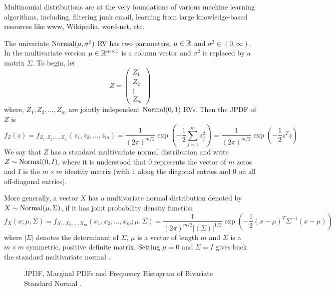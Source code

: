 Multinomial distributions are at the very foundations of various machine learning algorithms, including, filtering junk email, learning from large knowledge-based resources like www, Wikipedia, word-net, etc.


\begin{model}[$\normal(\mu,\Sigma)$ \rv]\label{M:MultivariateNormal}
The univariate $\mbox{{\rm Normal}}(\mu,\sigma^2)$ RV has two parameters, $\mu \in \mathbb{R}$ and $\sigma^2 \in (0,\infty)$.  
In the multivariate version $\mu \in \mathbb{R}^{m \times 1}$ is a column vector and $\sigma^2$ is replaced by a matrix $\Sigma$.  To begin, let
\[
Z = 
\left( 
\begin{array}{c}
Z_1 \\
Z_2 \\
\vdots \\
Z_m 
\end{array} 
\right)
\]
where, $Z_1,Z_2,\ldots,Z_m$ are jointly independent $\mbox{{\rm Normal}}(0,1)$ RVs.  Then the JPDF of $Z$ is
\[
f_Z(z) = f_{Z_1,Z_2,\ldots,Z_m}(z_1,z_2,\ldots,z_m) = \frac{1}{(2 \pi)^{m/2}} \exp \left( -\frac{1}{2} \sum_{j=1}^m z_j^2 \right) = \frac{1}{(2 \pi)^{m/2}} \exp \left( -\frac{1}{2} z^T z \right)
\]
We say that $Z$ has a standard multivariate normal distribution and write $Z \sim \mbox{{\rm Normal}}(0,I)$, where it is understood that $0$ represents the vector of $m$ zeros and $I$ is the $m \times m$ identity matrix (with $1$ along the diagonal entries and $0$ on all off-diagonal entries).

More generally, a vector $X$ has a multivariate normal distribution denoted by $X \sim \mbox{{\rm Normal}}(\mu,\Sigma)$, if it has joint probability density function
\[
f_X(x;\mu,\Sigma) = f_{X_1,X_2,\ldots,X_m}(x_1,x_2,\ldots,x_m; \mu,\Sigma) 
= \frac{1}{(2 \pi)^{m/2} |(\Sigma)|^{1/2}} \exp \left( -\frac{1}{2} (x - \mu)^T \Sigma^{-1} (x - \mu )\right) 
\]
where $|\Sigma|$ denotes the determinant of $\Sigma$, $\mu$ is a vector of length $m$ and $\Sigma$ is a $m \times m$ symmetric, positive definite matrix.  Setting $\mu=0$ and $\Sigma=I$ gives back the standard multivariate normal \rv.
\end{model}




\begin{figure}[htpb]
\caption{JPDF, Marginal PDFs and Frequency Histogram of Bivariate Standard Normal \rv.\label{F:BivariateStdNormalJPDFMPDFsFreHist}}
\centering   {}
\end{figure}

